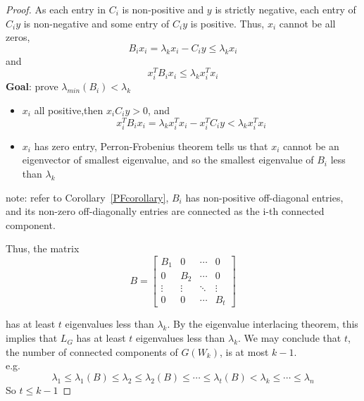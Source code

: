 \begin{proof}
As each entry in $C_i$ is non-positive and $y$ is strictly negative, each entry of $C_i y$ is non-negative and some entry of $C_i y$ is positive. Thus, $x_i$ cannot be all zeros,
\[
B_i x_i =\lambda_k x_i -C_i y \le \lambda_k x_i
\]
and 
\[
x_i^TB_i x_i \le \lambda_k x_i^T x_i
\]
\textbf{Goal}: prove $\lambda_{min}(B_i) <\lambda_k$
\begin{itemize}
    \item $x_i$ all positive,then $x_i C_i y >0$, and
    \[
        x_i^TB_i x_i = \lambda_k x_i^T x_i -x_i^TC_i y < \lambda_k x_i^T x_i
    \]
    \item $x_i$ has zero entry, Perron-Frobenius theorem tells us that $x_i$ cannot be an eigenvector of smallest eigenvalue, and so the smallest eigenvalue of $B_i $ less than $\lambda_k$

\end{itemize}
    note: refer to Corollary~\ref{PFcorollary},  $B_i$ has non-positive off-diagonal entries, and its non-zero off-diagonally entries are connected as the i-th connected component.
    
Thus, the matrix
\[
\displaystyle B=\left[\begin{array}{cccc}B_1 & 0 & \cdots &0 \\0 & B_2 &  \cdots  &0 \\ \vdots & \vdots &\ddots  & \vdots \\
   0& 0& \cdots  &B_t \end{array}\right]
\]

has  at least $t$ eigenvalues less than $\lambda_k$. By the eigenvalue interlacing theorem, this implies that $L_G$ has at least $t$ eigenvalues less than $\lambda_k$. We may conclude that $t$, the number of connected components of $G(W_k)$, is at most $k-1$.\\
e.g.
\[
    \lambda_1\le\lambda_1(B)\le \lambda_2 \le \lambda_2(B) \le \cdots \le \lambda_t(B) < \lambda_k \le \cdots \le \lambda_n
\]
So $t\le k-1$
\end{proof}